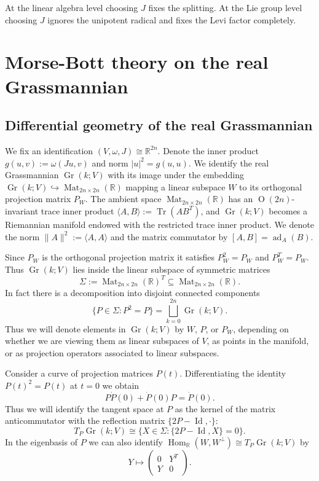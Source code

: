 \documentclass[12pt, final]{article}
\def\R{\mathbb{R}}
\def\ad{\operatorname{ad}}
\def\Hom{\operatorname{Hom}}
\def\O{\operatorname{O}}
\def\Mat{\operatorname{Mat}}
\def\Gr{\operatorname{Gr}}
\def\Tr{\operatorname{Tr}}
\def\Id{\operatorname{Id}}
\begin{document}
At the linear algebra level choosing $J$ fixes the splitting. At the Lie group level choosing $J$ ignores the unipotent radical and fixes the Levi factor completely.



\section{Morse-Bott theory on the real Grassmannian} \label{sec:morse_bott_theory}

\subsection{Differential geometry of the real Grassmannian} \label{subsec:diffgeo_grassmannian}

We fix an identification $(V, \omega, J) \cong \R^{2n}$. Denote the inner product $g(u, v):= \omega(Ju, v)$ and norm $|u|^2 = g(u, u)$. We identify the real Grassmannian $\Gr(k; V)$ with its image under the embedding $\Gr(k; V) \hookrightarrow \Mat_{2n \times 2n}(\R)$ mapping a linear subspace $W$ to its orthogonal projection matrix $P_W$. The ambient space $\Mat_{2n\times 2n}(\R)$ has an $\O(2n)$-invariant trace inner product $\langle A, B \rangle := \Tr(AB^T)$, and $\Gr(k; V)$ becomes a Riemannian manifold endowed with the restricted trace inner product. We denote the norm $\lVert A \rVert^2:= \langle A, A\rangle$ and the matrix commutator by $[A, B] = \ad_{A}(B)$.

Since $P_W$ is the orthogonal projection matrix it satisfies $P_W^2 = P_W$ and $P_W^T = P_W$. Thus $\Gr(k; V)$ lies inside the linear subspace of symmetric matrices 
\[ \Sigma:= \Mat_{2n \times 2n}(\R)^T \subseteq \Mat_{2n \times 2n}(\R).\] In fact there is a decomposition into disjoint connected components
\[ \{ P \in \Sigma : P^2 = P \} = \bigsqcup_{k = 0}^{2n} \Gr(k; V).\]
Thus we will denote elements in $\Gr(k; V)$ by $W$, $P$, or $P_W$, depending on whether we are viewing them as linear subspaces of $V$, as points in the manifold, or as projection operators associated to linear subspaces.

Consider a curve of projection matrices $P(t)$. Differentiating the identity $P(t)^2 = P(t)$ at $t = 0$ we obtain
\[ P \dot{P}(0) + \dot{P}(0) P = \dot{P}(0).\]
Thus we will identify the tangent space at $P$ as the kernel of the matrix anticommutator with the reflection matrix $\{2P-\Id, \cdot\}$:
\[ T_P \Gr(k; V) \cong \{ X \in \Sigma : \{2P-\Id, X\} = 0\}.\]
In the eigenbasis of $P$ we can also identify $\Hom_\R(W, W^\perp) \cong T_P\Gr(k; V)$ by
\[ Y \mapsto \begin{pmatrix} 0 & Y^T\\ Y & 0 \end{pmatrix}.\]
\end{document}
